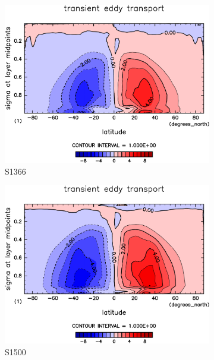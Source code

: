 \documentclass[body]{subfiles}
\begin{document}
\begin{figure}[t]
	\centering
	\begin{subfigure}{.4\textwidth}
		\centering
		\includegraphics[width=\textwidth]{S1366/MeriHeatTransTest@latentEn_TE,time=14600:14965-crop-rotate.pdf}
		\caption{S1366}\label{潜熱移動性擾乱S1366}
	\end{subfigure}
	\begin{subfigure}{.4\textwidth}
		\centering
		\includegraphics[width=\textwidth]{S1500/MeriHeatTransTest@latentEn_TE,time=3650:4015-crop-rotate.pdf}
		\caption{S1500}\label{潜熱移動性擾乱S1500}
	\end{subfigure}
	\begin{subfigure}{.4\textwidth}

\end{subfigure}
\end{figure}
\end{document}
